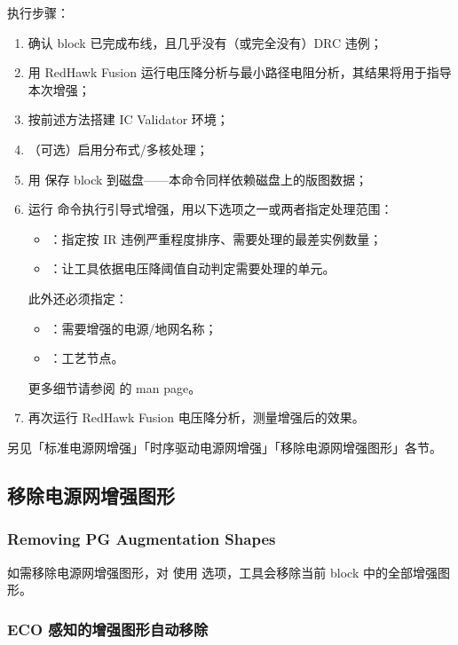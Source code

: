 执行步骤：
\begin{enumerate}
  \item 确认 block 已完成布线，且几乎没有（或完全没有）DRC 违例；
  \item 用 RedHawk Fusion 运行电压降分析与最小路径电阻分析，其结果将用于指导本次增强；
  \item 按前述方法搭建 IC Validator 环境；
  \item （可选）启用分布式/多核处理；
  \item 用  保存 block 到磁盘——本命令同样依赖磁盘上的版图数据；
  \item 运行  命令执行引导式增强，用以下选项之一或两者指定处理范围：
        \begin{itemize}
          \item {}：指定按 IR 违例严重程度排序、需要处理的最差实例数量；
          \item {}：让工具依据电压降阈值自动判定需要处理的单元。
        \end{itemize}
        此外还必须指定：
        \begin{itemize}
          \item {}：需要增强的电源/地网名称；
          \item {}：工艺节点。
        \end{itemize}
        更多细节请参阅  的 man page。
  \item 再次运行 RedHawk Fusion 电压降分析，测量增强后的效果。
\end{enumerate}

\begin{seeAlsoBox}
另见「标准电源网增强」「时序驱动电源网增强」「移除电源网增强图形」各节。
\end{seeAlsoBox}

\subsection{移除电源网增强图形}
\subsubsection*{Removing PG Augmentation Shapes}

如需移除电源网增强图形，对  使用  选项，工具会移除当前 block 中的全部增强图形。

\subsubsection{ECO 感知的增强图形自动移除}
